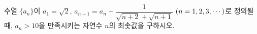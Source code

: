 수열 $\{a_n\}$이 $a_1=\sqrt{2}$, $a_{n+1}=a_n+\dfrac{1}{\sqrt{n+2}+\sqrt{n+1}}$ $(n=1{,}\mkern3mu\mathopen{}2{,}\mkern3mu\mathopen{}3{,}\mkern3mu\mathopen{}\cdots)$로 정의될 때, $a_n>10$을 만족시키는 자연수 $n$의 최솟값을 구하시오.
